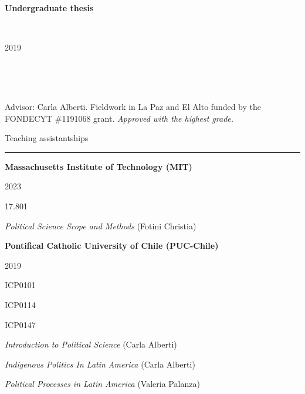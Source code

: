 \documentclass[a4paper, 12pt]{article}
\begin{document}
\textbf{Undergraduate thesis}

\begin{multicols}{2}

\textcolor{white}{XXXX}

2019

\textcolor{white}{XXXX}

\textcolor{white}{XXXX}

\columnbreak

 Advisor: Carla Alberti. Fieldwork in La Paz and El Alto funded by the FONDECYT \#1191068 grant. \textit{Approved with the highest grade.}

\end{multicols}




\newpage
\large Teaching assistantships
\smallskip
\hrule
\normalsize


\bigskip
\textbf{Massachusetts Institute of Technology (MIT)}

\begin{multicols}{3}

2023

\columnbreak

17.801

\columnbreak

\textit{Political Science Scope and Methods} (Fotini Christia)

\end{multicols}


\textbf{Pontifical Catholic University of Chile (PUC-Chile)}


\begin{multicols}{3}

2019

\columnbreak

ICP0101

ICP0114

ICP0147

\columnbreak

\textit{Introduction to Political Science} (Carla Alberti)

\textit{Indigenous Politics In Latin America} (Carla Alberti)

\textit{Political Processes in Latin America} (Valeria Palanza)

\end{multicols}
\end{document}
